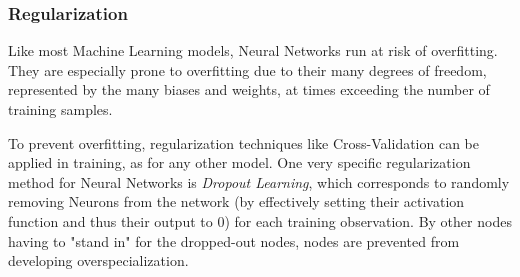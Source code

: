  \subsubsection{Regularization}
 
 Like most Machine Learning models, Neural Networks run at risk of overfitting. They are especially prone to overfitting due to their many degrees of freedom, represented by the many biases and weights, at times exceeding the number of training samples.

 To prevent overfitting, regularization techniques like Cross-Validation can be applied in training, as for any other model. One very specific regularization method for Neural Networks is \textit{Dropout Learning}, which corresponds to randomly removing Neurons from the network (by effectively setting their activation function and thus their output to 0) for each training observation. By other nodes having to "stand in" for the dropped-out nodes, nodes are prevented from developing overspecialization. \cite{James2023}

%
%
%
%


